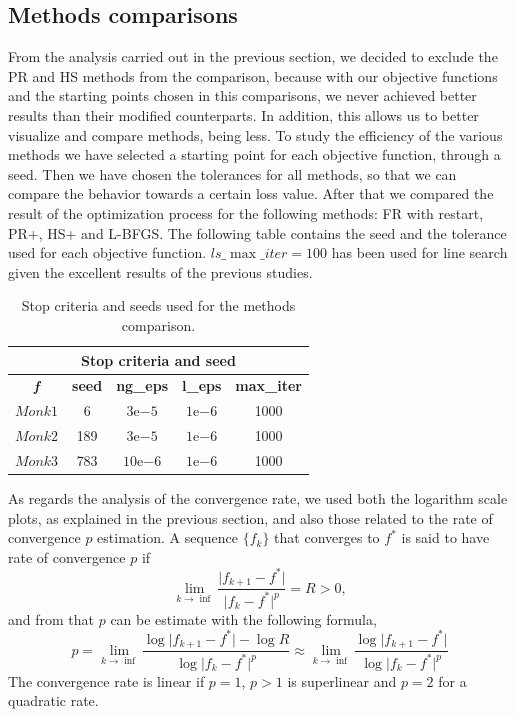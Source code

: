\documentclass[11pt]{article}
\begin{document}
\subsection{Methods comparisons}\label{sec:method_comparisons}
From the analysis carried out in the previous section, we decided to exclude the PR and HS methods from the comparison, because with our objective functions and the starting points chosen in this comparisons, we never achieved better results than their modified counterparts. In addition, this allows us to better visualize and compare methods, being less. To study the efficiency of the various methods we have selected a starting point for each objective function, through a seed. Then we have chosen the tolerances for all methods, so that we can compare the behavior towards a certain loss value. After that we compared the result of the optimization process for the following methods: FR with restart, PR+, HS+ and L-BFGS. The following table contains the seed and the tolerance used for each objective function. $ls\_\max\_iter = 100$ has been used for line search given the excellent results of the previous studies.
\begin{table}[H]
\small
    \centering
    \begin{tabular}{|c|c|c|c|c|}
        \hline
        \multicolumn{5}{|c|}{\textbf{Stop criteria and seed}} \\
        \hline
        \textit{\textbf{f}}   & \textbf{seed} &\textbf{ng\_eps} & \textbf{l\_eps} & \textbf{max\_iter} \\
        \hline
        $Monk1$ & 6 & $3\mathrm{e}{-5}$ & $1\mathrm{e}{-6}$ & 1000 \\
        \hline
        $Monk2$ & 189 & $3\mathrm{e}{-5}$ & $1\mathrm{e}{-6}$ & 1000 \\
        \hline
        $Monk3$ & 783 & $10\mathrm{e}{-6}$ & $1\mathrm{e}{-6}$ & 1000 \\
        \hline
    \end{tabular}
    \caption{Stop criteria and seeds used for the methods comparison. }
    \label{tab:monk_stop_criteria_method_comparison}
\end{table}
As regards the analysis of the convergence rate, we used both the logarithm scale plots, as explained in the previous section, and also those related to the rate of convergence $p$ estimation. A sequence $\{f_k\}$ that converges to $f^*$ is said to have rate of convergence $p$ if
$$ \lim_{k \rightarrow \inf} \frac{\lvert f_{k+1}-f^* \rvert}{\lvert f_{k}-f^* \rvert^p} = R >0,$$
and from that $p$ can be estimate with the following formula,
$$ p = \lim_{k \rightarrow \inf} \frac{\log\lvert f_{k+1}-f^* \rvert - \log R}{\log\lvert f_{k}-f^* \rvert^p} \approx \lim_{k \rightarrow \inf} \frac{\log\lvert f_{k+1}-f^* \rvert}{\log\lvert f_{k}-f^* \rvert^p} $$
The convergence rate is linear if $p=1$, $p>1$ is superlinear and $p=2$ for a quadratic rate.
\end{document}
